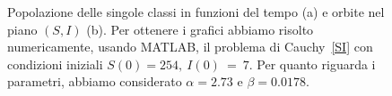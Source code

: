 \begin{figure}[ht]
\centering
\subfloat[][]{
\centering
\resizebox{0.45\textwidth}{!}
{

}
}
\subfloat[][]
{
\resizebox{0.45\textwidth}{!}{
}
}
\caption[Analisi dei dati della peste di Eyam]{Popolazione delle singole classi  in funzioni del tempo (a) e orbite nel piano $(S,I)$ (b).  Per ottenere i grafici abbiamo risolto  numericamente, usando MATLAB,  il problema di Cauchy~\eqref{SI} con  condizioni iniziali $S(0)=254, ~I(0)~=~7$.  Per quanto riguarda i parametri, abbiamo considerato    $\alpha=2.73$  e $\beta= 0.0178$.}
\label{fig::sirsemplice}
\end{figure}




